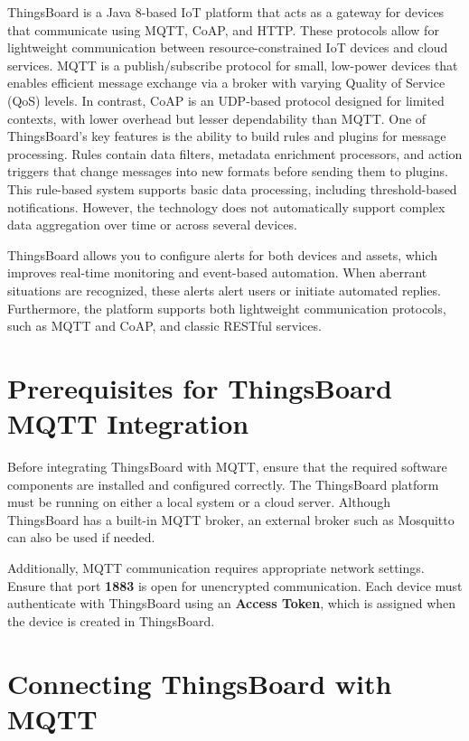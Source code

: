 \documentclass[a4paper,12pt]{report}
\begin{document}
ThingsBoard is a Java 8-based IoT platform that acts as a gateway for devices that communicate using MQTT\cite{kegenbekov2022using}, CoAP\cite{shelby2014rfc}, and HTTP\cite{yassein2016application}.  These protocols allow for lightweight communication between resource-constrained IoT devices and cloud services.  MQTT is a publish/subscribe protocol for small, low-power devices that enables efficient message exchange via a broker with varying Quality of Service (QoS) levels\cite{kegenbekov2022using}.  In contrast, CoAP is an UDP-based protocol designed for limited contexts, with lower overhead but lesser dependability than MQTT\cite{shelby2014rfc}.
One of ThingsBoard's key features is the ability to build rules and plugins for message processing.  Rules contain data filters, metadata enrichment processors, and action triggers that change messages into new formats before sending them to plugins.  This rule-based system supports basic data processing, including threshold-based notifications.  However, the technology does not automatically support complex data aggregation over time or across several devices\cite{hammi2018iot}.

 ThingsBoard allows you to configure alerts for both devices and assets, which improves real-time monitoring and event-based automation.  When aberrant situations are recognized, these alerts alert users or initiate automated replies.  Furthermore, the platform supports both lightweight communication protocols, such as MQTT and CoAP, and classic RESTful services\cite{shelby2014rfc}. 

 \section{Prerequisites for ThingsBoard MQTT Integration}

 Before integrating ThingsBoard with MQTT, ensure that the required software components are installed and configured correctly. The ThingsBoard platform must be running on either a local system or a cloud server. Although ThingsBoard has a built-in MQTT broker, an external broker such as Mosquitto can also be used if needed. 

 
 Additionally, MQTT communication requires appropriate network settings. Ensure that port \textbf{1883} is open for unencrypted communication. Each device must authenticate with ThingsBoard using an \textbf{Access Token}, which is assigned when the device is created in ThingsBoard.
 
 \section{Connecting ThingsBoard with MQTT}
 
\end{document}
